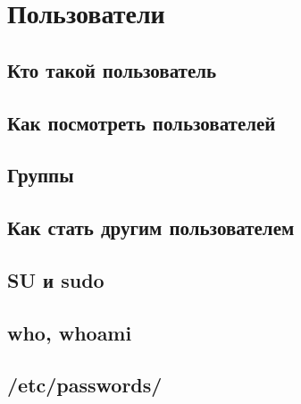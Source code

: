 \section{Пользователи}

\subsection{Кто такой пользователь}
\subsection{Как посмотреть пользователей}
\subsection{Группы}
\subsection{Как стать другим пользователем}
\subsection{SU и sudo}
\subsection{who, whoami}
\subsection{/etc/passwords/}
\newpage
